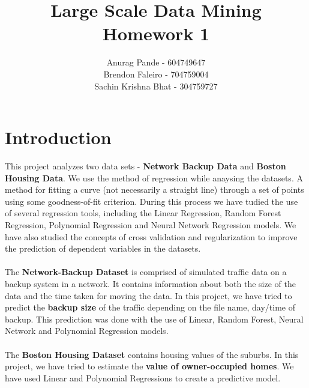 \documentclass[letterpaper,twocolumn,10pt]{article}
\begin{document}
\title{\Large \bf Large Scale Data Mining\\ Homework 1}
\author{
{\rm Anurag Pande - 604749647}\\
{\rm Brendon Faleiro - 704759004}\\
{\rm Sachin Krishna Bhat - 304759727}
}

\maketitle
\section{Introduction}
This project analyzes two data sets - \textbf{Network Backup Data} and \textbf{Boston Housing Data}. We use the method of regression while anaysing the datasets. A method for fitting a curve (not necessarily a straight line) through a set of points using some goodness-of-fit criterion\cite{wolfram}. During this process we have tudied the use of several regression tools, including the Linear Regression, Random Forest Regression, Polynomial Regression and Neural Network Regression models. We have also studied the concepts of cross validation and regularization to improve the prediction of dependent variables in the datasets.\\\\
The \textbf{Network-Backup Dataset} is comprised of simulated traffic data on a backup system in a network. It contains information about both the size of the data and the time taken for moving the data. In this project, we have tried to predict the \textbf{backup size} of the traffic depending on the file name, day/time of backup. This prediction was done with the use of Linear, Random Forest, Neural Network and Polynomial Regression models.\\\\ 
The \textbf{Boston Housing Dataset} contains housing values of the suburbs. In this project, we have tried to estimate the \textbf{value of owner-occupied homes}. We have used Linear and Polynomial Regressions to create a predictive model.
\end{document}
